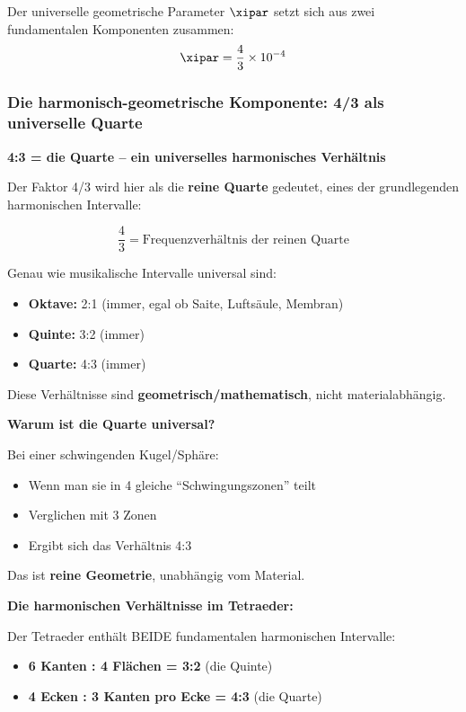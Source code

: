 Der universelle geometrische Parameter $\xipar$ setzt sich aus zwei fundamentalen Komponenten zusammen:
\begin{equation}
	\xipar = \frac{4}{3} \times 10^{-4}
\end{equation}

\subsubsection{Die harmonisch-geometrische Komponente: 4/3 als universelle Quarte}

\textbf{4:3 = die Quarte -- ein universelles harmonisches Verhältnis}

Der Faktor 4/3 wird hier als die \textbf{reine Quarte} gedeutet, eines der grundlegenden harmonischen Intervalle:

\begin{equation}
	\frac{4}{3} = \text{Frequenzverhältnis der reinen Quarte}
\end{equation}

Genau wie musikalische Intervalle universal sind:
\begin{itemize}
	\item \textbf{Oktave:} 2:1 (immer, egal ob Saite, Luftsäule, Membran)
	\item \textbf{Quinte:} 3:2 (immer)
	\item \textbf{Quarte:} 4:3 (immer)
\end{itemize}

Diese Verhältnisse sind \textbf{geometrisch/mathematisch}, nicht materialabhängig.

\textbf{Warum ist die Quarte universal?}

Bei einer schwingenden Kugel/Sphäre:
\begin{itemize}
	\item Wenn man sie in 4 gleiche ``Schwingungszonen'' teilt
	\item Verglichen mit 3 Zonen
	\item Ergibt sich das Verhältnis 4:3
\end{itemize}

Das ist \textbf{reine Geometrie}, unabhängig vom Material.

\textbf{Die harmonischen Verhältnisse im Tetraeder:}

Der Tetraeder enthält BEIDE fundamentalen harmonischen Intervalle:
\begin{itemize}
	\item \textbf{6 Kanten : 4 Flächen = 3:2} (die Quinte)
	\item \textbf{4 Ecken : 3 Kanten pro Ecke = 4:3} (die Quarte)
\end{itemize}

